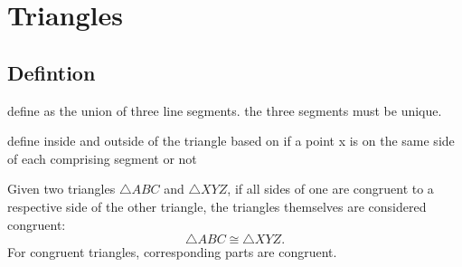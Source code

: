 \documentclass[../../../main/main.tex]{subfiles}
\begin{document}
\chapter{Triangles}

\section{Defintion}

define as the union of three line segments. the three segments must be unique.

define inside and outside of the triangle based on if a point x is on the same side of each comprising segment or not

\begin{axiom}
	Given two triangles $\triangle ABC$ and $\triangle XYZ$, if all sides of one are congruent to a respective side of the other triangle, the triangles themselves are considered congruent:
	\[
	\triangle ABC \cong \triangle XYZ.
	\]
	For congruent triangles, corresponding parts are congruent.
\end{axiom}
\end{document}
